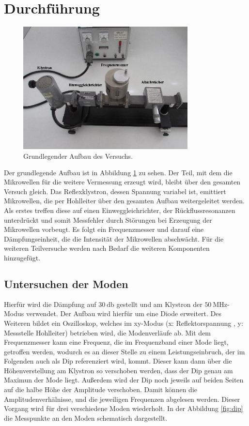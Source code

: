 \section{Durchführung}
\label{sec:Durchführung}

\begin{figure}
    \centering
    \includegraphics[width=0.8\textwidth]{Bilder/grundaufbau.png}
    \caption{Grundlegender Aufbau des Versuchs.}
    \label{fig:grund}
\end{figure}
\FloatBarrier

Der grundlegende Aufbau ist in Abbildung \ref{fig:grund} zu sehen. Der Teil, mit dem die Mikrowellen für die weitere Vermessung erzeugt wird, bleibt über den 
gesamten Versuch gleich. Das Reflexklystron, dessen Spannung variabel ist, emittiert Mikrowellen, die per Hohlleiter über den gesamten Aufbau weitergeleitet werden. Als 
erstes treffen diese auf einen Einweggleichrichter, der Rückflussresonanzen unterdrückt und somit Messfehler durch Störungen bei Erzeugung der Mikrowellen vorbeugt. Es folgt ein Frequenzmesser und darauf eine Dämpfungseinheit,
die die Intensität der Mikrowellen abschwächt. Für die weiteren Teilversuche werden nach Bedarf die weiteren Komponenten hinzugefügt.

\subsection{Untersuchen der Moden}

Hierfür wird die Dämpfung auf $\SI{30}{\decibel} $ gestellt und am Klystron der $\SI{50}{\mega\hertz} $-Modus verwendet.
Der Aufbau wird hierfür um eine Diode erweitert. Des Weiteren bildet ein Oszilloskop, welches im xy-Modus (x: Reflektorspannung , y: Messstelle Hohlleiter) 
betrieben wird, die Modenverläufe ab. Mit dem Frequenzmesser kann eine Frequenz, die im Frequenzband einer Mode liegt, getroffen werden, wodurch es an dieser Stelle zu einem 
Leistungseinbruch, der im Folgenden auch als Dip referenziert wird, kommt. Dieser kann dann über die Höhenverstellung am Klystron so verschoben werden, dass der Dip genau am 
Maximun der Mode liegt. Außerdem wird der Dip noch jeweils auf beiden Seiten auf die halbe Höhe der Amplitude verschoben. Damit können die Amplitudenverhälnisse, und die jeweiligen 
Frequenzen abgelesen werden. Dieser Vorgang wird für drei verschiedene Moden wiederholt. In der Abbildung \ref{fig:dip} die Messpunkte an den Moden schematisch dargestellt. 

